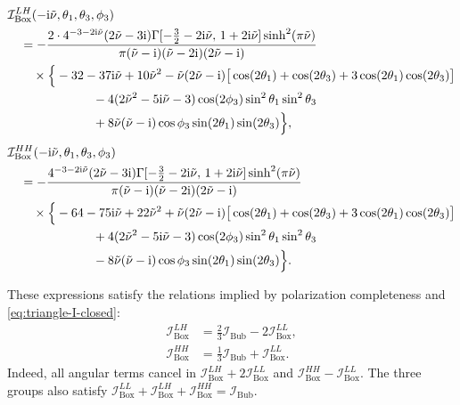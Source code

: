 \documentclass[a4paper,12pt]{article}
\def\ii{\mathrm{i}}
\begin{document}
\begin{align}
    &\mathcal I^{LH}_{\mathrm{Box}}
    (-\ii\tilde\nu,\theta_1,\theta_3,\phi_3)
    \nonumber\\
    &\quad=-\frac{2\cdot4^{-3-2\ii\tilde\nu}(2\tilde\nu-3\ii)
    \Gamma[-\tfrac32-2\ii\tilde\nu,\,1+2\ii\tilde\nu]
    \sinh^2(\pi\tilde\nu)}
    {\pi(\tilde\nu-\ii)(\tilde\nu-2\ii)(2\tilde\nu-\ii)}
    \nonumber\\
    &\qquad\times\Big\{
    -32-37\ii\tilde\nu+10\tilde\nu^2
    -\tilde\nu(2\tilde\nu-\ii)
    \big[\cos(2\theta_1)+\cos(2\theta_3)
    +3\cos(2\theta_1)\cos(2\theta_3)\big]
    \nonumber\\
    &\hspace{24mm}
    -4(2\tilde\nu^2-5\ii\tilde\nu-3)
    \cos(2\phi_3)\sin^2\theta_1\sin^2\theta_3
    \nonumber\\
    &\hspace{24mm}
    +8\tilde\nu(\tilde\nu-\ii)\cos\phi_3
    \sin(2\theta_1)\sin(2\theta_3)\Big\},
    \label{eq:box-ILH-explicit}\\[1ex]
    &\mathcal I^{HH}_{\mathrm{Box}}
    (-\ii\tilde\nu,\theta_1,\theta_3,\phi_3)
    \nonumber\\
    &\quad=-\frac{4^{-3-2\ii\tilde\nu}(2\tilde\nu-3\ii)
    \Gamma[-\tfrac32-2\ii\tilde\nu,\,1+2\ii\tilde\nu]
    \sinh^2(\pi\tilde\nu)}
    {\pi(\tilde\nu-\ii)(\tilde\nu-2\ii)(2\tilde\nu-\ii)}
    \nonumber\\
    &\qquad\times\Big\{
    -64-75\ii\tilde\nu+22\tilde\nu^2
    +\tilde\nu(2\tilde\nu-\ii)
    \big[\cos(2\theta_1)+\cos(2\theta_3)
    +3\cos(2\theta_1)\cos(2\theta_3)\big]
    \nonumber\\
    &\hspace{24mm}
    +4(2\tilde\nu^2-5\ii\tilde\nu-3)
    \cos(2\phi_3)\sin^2\theta_1\sin^2\theta_3
    \nonumber\\
    &\hspace{24mm}
    -8\tilde\nu(\tilde\nu-\ii)\cos\phi_3
    \sin(2\theta_1)\sin(2\theta_3)\Big\}.
    \label{eq:box-IHH-explicit}
\end{align}

These expressions satisfy the relations implied by polarization completeness and \eqref{eq:triangle-I-closed}:
\begin{align}
    \mathcal I^{LH}_{\mathrm{Box}}
    &=\frac23\mathcal I_{\mathrm{Bub}}-2\mathcal I^{LL}_{\mathrm{Box}},
    \label{eq:box-ILH-closed}\\
    \mathcal I^{HH}_{\mathrm{Box}}
    &=\frac13\mathcal I_{\mathrm{Bub}}+\mathcal I^{LL}_{\mathrm{Box}}.
    \label{eq:box-IHH-closed}
\end{align}
Indeed, all angular terms cancel in $\mathcal I^{LH}_{\mathrm{Box}}+2\mathcal I^{LL}_{\mathrm{Box}}$ and $\mathcal I^{HH}_{\mathrm{Box}}-\mathcal I^{LL}_{\mathrm{Box}}$.
The three groups also satisfy $\mathcal I^{LL}_{\mathrm{Box}}+\mathcal I^{LH}_{\mathrm{Box}} +\mathcal I^{HH}_{\mathrm{Box}}=\mathcal I_{\mathrm{Bub}}$.
\end{document}
